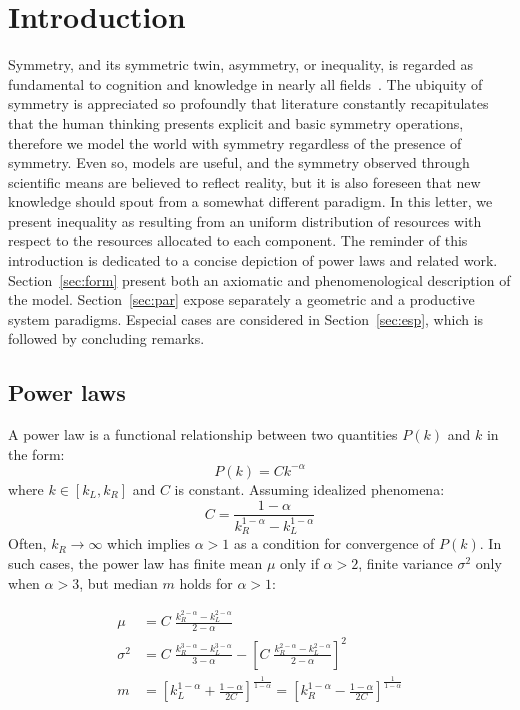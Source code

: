 \documentclass[a4paper, 11pt]{article} %
\begin{document}
\section{Introduction}
Symmetry, and its symmetric twin, asymmetry, or inequality,
is regarded as fundamental to cognition 
and knowledge in nearly all fields~\cite{deleuze,part}.
The ubiquity of symmetry is appreciated so profoundly that
literature constantly recapitulates that 
the human thinking presents
explicit and basic symmetry operations,
therefore we model the world with symmetry
regardless of the presence of symmetry.
Even so, models are useful, and the symmetry observed through scientific
means are believed to reflect reality, but it is also foreseen
that new knowledge should spout from a somewhat different paradigm.
In this letter, we present inequality as resulting from
an uniform distribution of resources with
respect to the resources allocated 
to each component.
The reminder of this introduction is dedicated
to a concise depiction of power laws and related work.
Section~\ref{sec:form} present both an axiomatic and phenomenological
description of the model.
Section~\ref{sec:par} expose separately a geometric and a productive system
paradigms.
Especial cases are considered in Section~\ref{sec:esp},
which is followed by concluding remarks.

\subsection{Power laws}
A power law is a functional relationship between two quantities $P(k)$ and $k$ in the form:
\begin{equation}\label{eq:pow}
P(k) = Ck^{-\alpha}
\end{equation}
\noindent where $k\in [k_L,k_R]$
and $C$ is constant.
Assuming idealized phenomena:
\begin{equation}
C=\frac{1-\alpha}{k_R^{1-\alpha}-k_L^{1-\alpha}}
\end{equation}
\noindent Often, $k_R\rightarrow \infty$ which implies $\alpha>1$ as a condition for convergence of $P(k)$.
In such cases, the power law has finite mean $\mu$ only if $\alpha>2$,
finite variance $\sigma^2$ only when $\alpha>3$, but median $m$ holds for $\alpha>1$:

\begin{align}\label{eq:md}
	\mu & =C\;\frac{k_R^{2-\alpha}-k_L^{2-\alpha}}{2-\alpha}\nonumber\\
	\sigma^2 & =C\;\frac{k_R^{3-\alpha}-k_L^{3-\alpha}}{3-\alpha}  -\left[C\;\frac{k_R^{2-\alpha}-k_L^{2-\alpha}}{2-\alpha}\right]^2\\
	m &=\left[k_L^{1-\alpha}+\frac{1-\alpha}{2C}\right]^{\frac{1}{1-\alpha}}=
	\left[k_R^{1-\alpha}-\frac{1-\alpha}{2C}\right]^{\frac{1}{1-\alpha}}\nonumber
\end{align}
\end{document}
